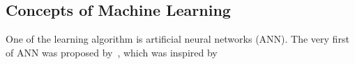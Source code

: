 \subsection{Concepts of Machine Learning}
One of the learning algorithm is artificial neural networks (ANN). The very first of ANN was proposed by~\citet{McCulloch_1943}, which was inspired by 